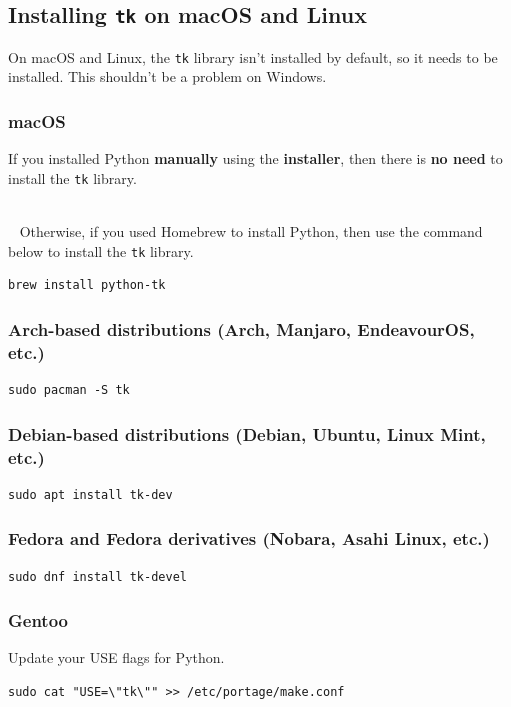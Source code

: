\documentclass[11pt]{article}
\begin{document}
 \newpage

\subsection{Installing \texttt{tk} on macOS and Linux}
\label{sec:org6045a45}
On macOS and Linux, the \texttt{tk} library isn't installed by default, so it needs to be installed. This shouldn't be a problem on Windows.

\subsubsection{macOS}
\label{sec:orgb9782d4}
If you installed Python \textbf{manually} using the \textbf{installer}, then there is \textbf{no need} to install the \texttt{tk} library.

 ~\\~  Otherwise, if you used Homebrew to install Python, then use the command below to install the \texttt{tk} library.
\begin{verbatim}
brew install python-tk
\end{verbatim}

\subsubsection{Arch-based distributions (Arch, Manjaro, EndeavourOS, etc.)}
\label{sec:org7fca6d0}
\begin{verbatim}
sudo pacman -S tk
\end{verbatim}

\subsubsection{Debian-based distributions (Debian, Ubuntu, Linux Mint, etc.)}
\label{sec:org89f5c1e}
\begin{verbatim}
sudo apt install tk-dev
\end{verbatim}

\subsubsection{Fedora and Fedora derivatives (Nobara, Asahi Linux, etc.)}
\label{sec:org396c9d2}
\begin{verbatim}
sudo dnf install tk-devel
\end{verbatim}

\subsubsection{Gentoo}
\label{sec:org6e9786a}
Update your USE flags for Python.
\begin{verbatim}
sudo cat "USE=\"tk\"" >> /etc/portage/make.conf
\end{verbatim}
\end{document}
